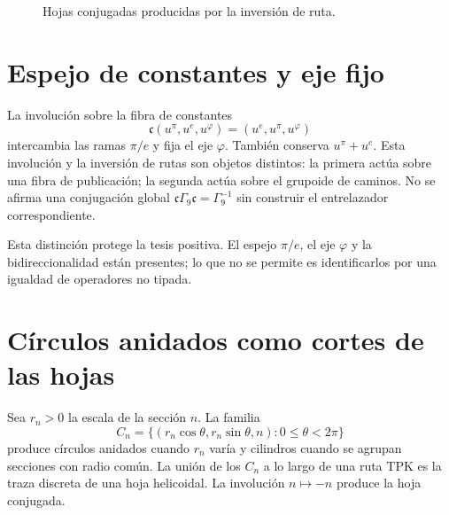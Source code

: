 \begin{figure}[htbp]
\centering
{}
\caption{Hojas conjugadas producidas por la inversión de ruta.}
\label{espiral:fig:hojas-conjugadas}
\end{figure}

\section{Espejo de constantes y eje fijo}

La involución sobre la fibra de constantes
\[
 \mathfrak c(u^\pi,u^e,u^\varphi)
 =(u^e,u^\pi,u^\varphi)
\]
intercambia las ramas \(\pi/e\) y fija el eje \(\varphi\). También conserva
\(u^\pi+u^e\). Esta involución y la inversión de rutas son objetos distintos:
la primera actúa sobre una fibra de publicación; la segunda actúa sobre el
grupoide de caminos. No se afirma una conjugación global
\(\mathfrak c\Gamma_9\mathfrak c=\Gamma_9^{-1}\) sin construir el
entrelazador correspondiente.

Esta distinción protege la tesis positiva. El espejo \(\pi/e\), el eje
\(\varphi\) y la bidireccionalidad están presentes; lo que no se permite es
identificarlos por una igualdad de operadores no tipada.

\section{Círculos anidados como cortes de las hojas}

Sea \(r_n>0\) la escala de la sección \(n\). La familia
\[
 C_n=\{(r_n\cos\theta,r_n\sin\theta,n):0\le\theta<2\pi\}
\]
produce círculos anidados cuando \(r_n\) varía y cilindros cuando se agrupan
secciones con radio común. La unión de los \(C_n\) a lo largo de una ruta
TPK es la traza discreta de una hoja helicoidal. La involución
\(n\mapsto-n\) produce la hoja conjugada.
